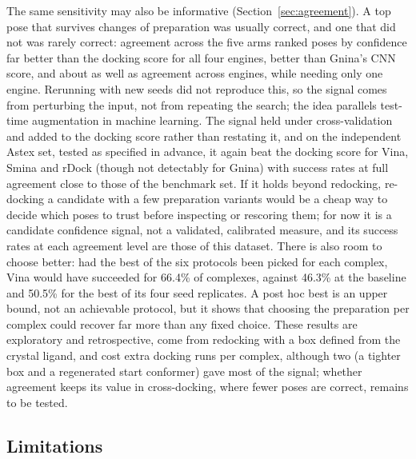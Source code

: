 The same sensitivity may also be informative (Section~\ref{sec:agreement}). A top pose that
survives changes of preparation was usually correct, and one that did not was rarely
correct: agreement across the five arms ranked poses by confidence far better than the
docking score for all four engines, better than Gnina's CNN score, and about as well as
agreement across engines, while needing only one engine. Rerunning with new seeds did not
reproduce this, so the signal comes from perturbing the input, not from repeating the
search; the idea parallels test-time augmentation in machine learning. The signal held under cross-validation and added to the docking score rather than
restating it, and on the independent Astex set, tested as specified in advance, it again beat
the docking score for Vina, Smina and rDock (though not detectably for Gnina) with success
rates at full agreement close to those of the benchmark set. If it holds beyond redocking,
re-docking a candidate with a few preparation
variants would be a cheap way to decide which poses to trust before inspecting or rescoring
them; for now it is a candidate confidence signal, not a validated, calibrated measure, and
its success rates at each agreement level are those of this dataset. There is also room to choose better: had the
best of the six protocols been picked for each complex, Vina would have succeeded for 66.4\%
of complexes, against 46.3\% at the baseline and 50.5\% for the best of its four seed
replicates. A post hoc best is an upper bound, not an achievable protocol, but it shows that
choosing the preparation per complex could recover far more than any fixed choice. These
results are exploratory and retrospective, come from redocking with a box defined from the
crystal ligand, and cost extra docking runs per complex, although two (a tighter box and a
regenerated start conformer) gave most of the signal; whether agreement keeps its
value in cross-docking, where fewer poses are correct, remains to be tested.

\subsection{Limitations}

